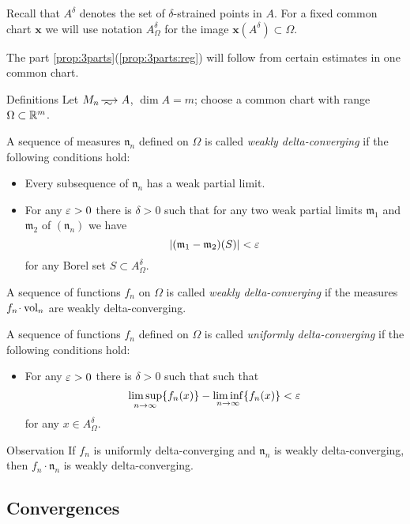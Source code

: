 Recall that $A^\delta$ denotes the set of $\delta$-strained points in $A$.
For a fixed common chart $\bm{x}$ we will use notation $A^\delta_\Omega$ for the image $\bm{x}(A^\delta)\subset \Omega$.

The part \ref{prop:3parts}(\ref{prop:3parts:reg}) will follow from certain estimates in one common chart.

\begin{thm}{Definitions}\label{def:delta-converge}
Let $M_n\smooths{} A$, $\dim A=m$;
choose a common chart with range $\Omega\subset \mathbb{R}^m$.

A sequence of measures $\mathfrak n_n$ defined on $\Omega$ is called \emph{weakly delta-converging}
if the following conditions hold:
\begin{itemize}
 \item Every subsequence of $\mathfrak n_n$ has a weak partial limit.
 \item For any $\varepsilon>0$ there is $\delta>0$ such that for any two weak partial limits $\mathfrak m_1$ and $\mathfrak m_2$ of $(\mathfrak n_n)$ we have  
\[|(\mathfrak m_1-\mathfrak m_2)(S)|<\varepsilon\]
for any Borel set $S\subset A^\delta_\Omega$.
\end{itemize}
A sequence of functions $f_n$ on $\Omega$ is called \emph{weakly delta-converging} if the measures $f_n\cdot \vol_n$ are weakly delta-converging.

A sequence of functions $f_n$ defined on $\Omega$ is called \emph{uniformly delta-converging}
if the following conditions hold:
\begin{itemize}
 \item For any $\varepsilon>0$ there is $\delta>0$ such that such that 
\[\limsup_{n\to\infty} \{f_n(x)\}-\liminf_{n\to\infty}\{f_n(x)\}<  \varepsilon\]
for any $x\in A^\delta_\Omega$.
\end{itemize}

\end{thm}

\begin{thm}{Observation}\label{obs:delta-weak-uniform}
If $f_n$ is uniformly delta-converging and $\mathfrak n_n$ is weakly delta-converging,
then $f_n\cdot \mathfrak n_n$ is weakly delta-converging.
\end{thm}

\subsection{Convergences}\label{sec:test-convergence}

